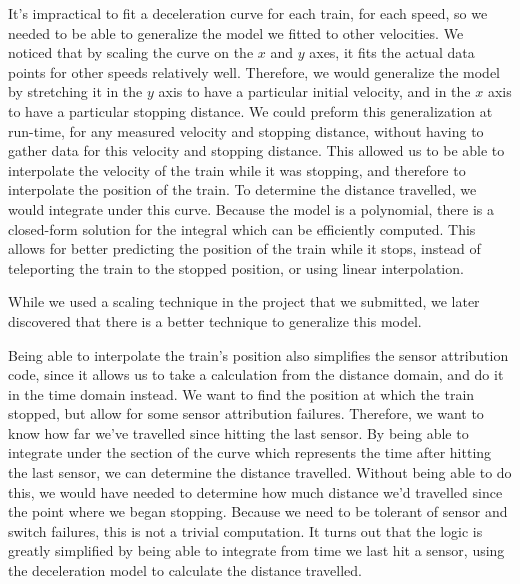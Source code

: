 \documentclass{article}
\begin{document}
It's impractical to fit a deceleration curve for each train, for each speed,
so we needed to be able to generalize the model we fitted to other velocities.
We noticed that by scaling the curve on the $x$ and $y$ axes, it fits
the actual data points for other speeds relatively well.
Therefore, we would generalize the model by stretching it in the $y$ axis
to have a particular initial velocity, and in the $x$ axis to have a particular
stopping distance.
We could preform this generalization at run-time, for any measured velocity and
stopping distance, without having to gather data for this velocity and stopping distance.
This allowed us to be able to interpolate the velocity of the train while
it was stopping, and therefore to interpolate the position of the train.
To determine the distance travelled, we would integrate under this curve.
Because the model is a polynomial, there is a closed-form solution
for the integral which can be efficiently computed.
This allows for better predicting the position of the train
while it stops, instead of teleporting the train to the stopped position,
or using linear interpolation.

While we used a scaling technique in the project that we submitted, we later
discovered that there is a better technique to generalize this model.

Being able to interpolate the train's position
also simplifies the sensor attribution code, since it allows
us to take a calculation from the distance domain, and do it in
the time domain instead.
We want to find the position at which the train stopped, but allow
for some sensor attribution failures.
Therefore, we want to know how far we've travelled since hitting the last sensor.
By being able to integrate under the section of the curve which represents
the time after hitting the last sensor, we can determine the distance travelled.
Without being able to do this, we would have needed to determine how much distance we'd
travelled since the point where we began stopping.
Because we need to be tolerant of sensor and switch failures, this is not a trivial computation.
It turns out that the logic is greatly simplified by being able to integrate from time
we last hit a sensor, using the deceleration model to calculate the distance travelled.
\end{document}
